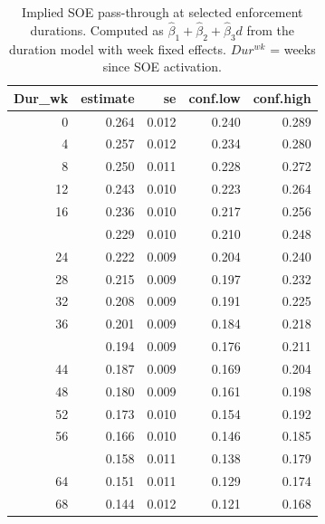 \begin{table}[!h]
\centering
\caption{\label{tab:tab:passthrough_implied_soe}Implied SOE pass-through at selected enforcement durations. Computed as $\hat{\beta}_1 + \hat{\beta}_2 + \hat{\beta}_3 d$ from the duration model with week fixed effects. $Dur^{wk}$ = weeks since SOE activation.}
\centering
\begin{tabular}[t]{rrrrr}
\toprule
Dur\_wk & estimate & se & conf.low & conf.high\\
\midrule
0 & 0.264 & 0.012 & 0.240 & 0.289\\
4 & 0.257 & 0.012 & 0.234 & 0.280\\
8 & 0.250 & 0.011 & 0.228 & 0.272\\
12 & 0.243 & 0.010 & 0.223 & 0.264\\
16 & 0.236 & 0.010 & 0.217 & 0.256\\
\addlinespace
20 & 0.229 & 0.010 & 0.210 & 0.248\\
24 & 0.222 & 0.009 & 0.204 & 0.240\\
28 & 0.215 & 0.009 & 0.197 & 0.232\\
32 & 0.208 & 0.009 & 0.191 & 0.225\\
36 & 0.201 & 0.009 & 0.184 & 0.218\\
\addlinespace
40 & 0.194 & 0.009 & 0.176 & 0.211\\
44 & 0.187 & 0.009 & 0.169 & 0.204\\
48 & 0.180 & 0.009 & 0.161 & 0.198\\
52 & 0.173 & 0.010 & 0.154 & 0.192\\
56 & 0.166 & 0.010 & 0.146 & 0.185\\
\addlinespace
60 & 0.158 & 0.011 & 0.138 & 0.179\\
64 & 0.151 & 0.011 & 0.129 & 0.174\\
68 & 0.144 & 0.012 & 0.121 & 0.168\\
\bottomrule
\end{tabular}
\end{table}
